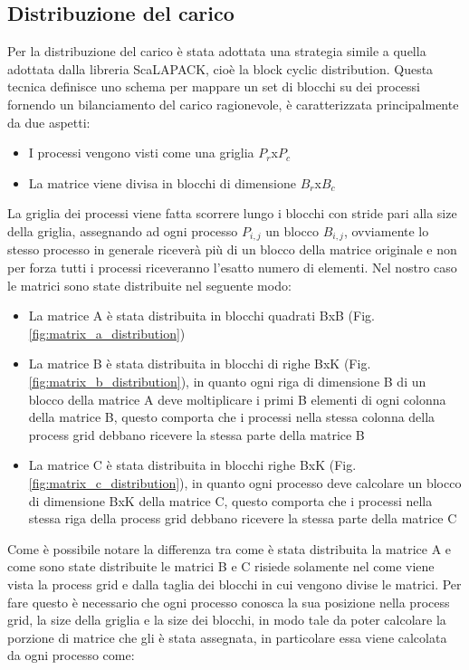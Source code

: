 \documentclass[conference]{IEEEtran}
\begin{document}
\subsection{Distribuzione del carico}
Per la distribuzione del carico è stata adottata una strategia simile a quella adottata dalla libreria ScaLAPACK, cioè la block cyclic distribution. Questa tecnica definisce uno schema per mappare un set di blocchi su dei processi fornendo un bilanciamento del carico ragionevole, è caratterizzata principalmente da due aspetti:
\begin{itemize}
    \item I processi vengono visti come una griglia $P_r$x$P_c$
    \item La matrice viene divisa in blocchi di dimensione $B_r$x$B_c$
\end{itemize}
La griglia dei processi viene fatta scorrere lungo i blocchi con stride pari alla size della griglia, assegnando ad ogni processo $P_{i,j}$ un blocco $B_{i,j}$, ovviamente lo stesso processo in generale riceverà più di un blocco della matrice originale e non per forza tutti i processi riceveranno l'esatto numero di elementi.
Nel nostro caso le matrici sono state distribuite nel seguente modo:
\begin{itemize}
    \item La matrice A è stata distribuita in blocchi quadrati BxB (Fig. \ref{fig:matrix_a_distribution})
    \item La matrice B è stata distribuita in blocchi di righe BxK (Fig. \ref{fig:matrix_b_distribution}), in quanto ogni riga di dimensione B di un blocco della matrice A deve moltiplicare i primi B elementi di ogni colonna della matrice B, questo comporta che i processi nella stessa colonna della process grid debbano ricevere la stessa parte della matrice B
    \item La matrice C è stata distribuita in blocchi righe BxK (Fig. \ref{fig:matrix_c_distribution}), in quanto ogni processo deve calcolare un blocco di dimensione BxK della matrice C, questo comporta che i processi nella stessa riga della process grid debbano ricevere la stessa parte della matrice C
\end{itemize} 
Come è possibile notare la differenza tra come è stata distribuita la matrice A e come sono state distribuite le matrici B e C risiede solamente nel come viene vista la process grid e dalla taglia dei blocchi in cui vengono divise le matrici.
Per fare questo è necessario che ogni processo conosca la sua posizione nella process grid, la size della griglia e la size dei blocchi, in modo tale da poter calcolare la porzione di matrice che gli è stata assegnata, in particolare essa viene calcolata da ogni processo come:
\end{document}
